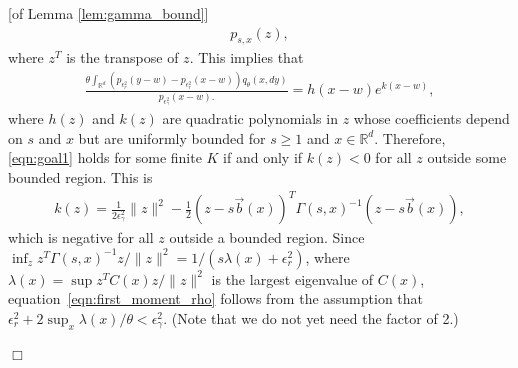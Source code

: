 \documentclass[12pt]{article}
\newenvironment {proof}{{\noindent\bf Proof }}{\hfill $\Box$ \medskip}
\newcommand{\IR}{\mathbb R}
\newcommand{\meanq}{\vec b}    %
\newcommand{\covq}{C}     %
\begin{document}
\begin{proof}[of Lemma \ref{lem:gamma_bound}]
\begin{align*}
        p_{s, x}(z) ,
    \end{align*}
    where $z^T$ is the transpose of $z$.
    This implies that
    \begin{align*}
        \frac{
        \theta
            \int_{\IR^d}
                ( p_{\epsilon_r^2}(y-w) - p_{\epsilon_r^2}(x-w) )
            q_\theta(x, dy)
        }{
            p_{\epsilon^2_\gamma}(x-w) .
        }
        =
        h(x-w) e^{k(x-w)},
    \end{align*}
    where $h(z)$ and $k(z)$ are quadratic polynomials in $z$
    whose coefficients depend on $s$ and $x$ but are uniformly bounded for $s \ge 1$
    and $x \in \IR^d$.
    Therefore, \eqref{eqn:goal1} holds for some finite $K$
    if and only if $k(z) < 0$ for all $z$ outside some bounded region.
    This is
    \begin{align*}
        k(z)
        =
        \frac{1}{2\epsilon_\gamma^2} \|z\|^2
        -\frac{1}{2} (z - s\meanq(x))^T \Gamma(s,x)^{-1} (z - s\meanq(x)) ,
    \end{align*}
    which is negative for all $z$ outside a bounded region.
    Since $\inf_z z^T \Gamma(s,x)^{-1} z / \|z\|^2 = 1 / (s \lambda(x) + \epsilon_r^2)$,
    where $\lambda(x) = \sup z^T \covq(x) z / \|z\|^2$ is the largest eigenvalue of $\covq(x)$,
    equation~\eqref{eqn:first_moment_rho} follows from the assumption
    that $\epsilon_r^2 + 2 \sup_x \lambda(x)/\theta < \epsilon_\gamma^2$.
    (Note that we do not yet need the factor of 2.)


\end{proof}
\end{document}
